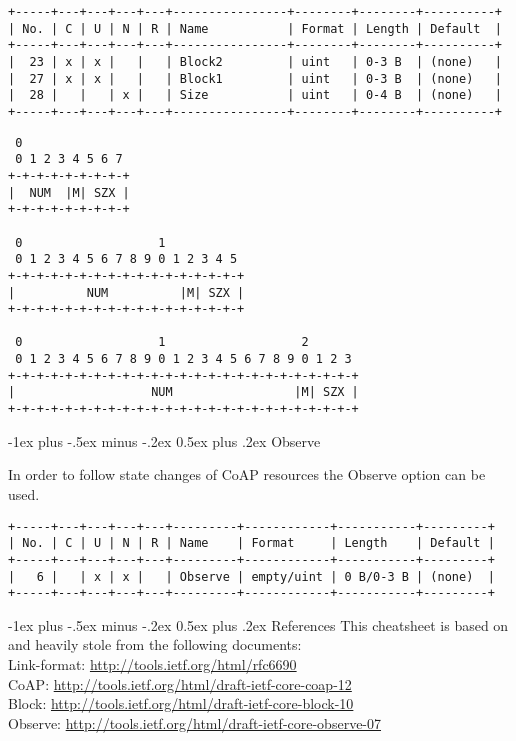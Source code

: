 \documentclass[10pt,landscape]{article}
\makeatletter
\renewcommand{\section}{\@startsection{section}{1}{0mm}%
                                {-1ex plus -.5ex minus -.2ex}%
                                {0.5ex plus .2ex}%
                                {\normalfont\large\bfseries}}
\makeatother
\begin{document}
\begin{multicols}{3}
{\tiny
\begin{verbatim}
+-----+---+---+---+---+----------------+--------+--------+----------+
| No. | C | U | N | R | Name           | Format | Length | Default  |
+-----+---+---+---+---+----------------+--------+--------+----------+
|  23 | x | x |   |   | Block2         | uint   | 0-3 B  | (none)   |
|  27 | x | x |   |   | Block1         | uint   | 0-3 B  | (none)   |
|  28 |   |   | x |   | Size           | uint   | 0-4 B  | (none)   |
+-----+---+---+---+---+----------------+--------+--------+----------+
\end{verbatim}
}
{\tiny
\begin{verbatim}
 0
 0 1 2 3 4 5 6 7
+-+-+-+-+-+-+-+-+
|  NUM  |M| SZX |
+-+-+-+-+-+-+-+-+

 0                   1
 0 1 2 3 4 5 6 7 8 9 0 1 2 3 4 5
+-+-+-+-+-+-+-+-+-+-+-+-+-+-+-+-+
|          NUM          |M| SZX |
+-+-+-+-+-+-+-+-+-+-+-+-+-+-+-+-+

 0                   1                   2
 0 1 2 3 4 5 6 7 8 9 0 1 2 3 4 5 6 7 8 9 0 1 2 3
+-+-+-+-+-+-+-+-+-+-+-+-+-+-+-+-+-+-+-+-+-+-+-+-+
|                   NUM                 |M| SZX |
+-+-+-+-+-+-+-+-+-+-+-+-+-+-+-+-+-+-+-+-+-+-+-+-+
\end{verbatim}
}

\section{Observe}

In order to follow state changes of CoAP resources the Observe option
can be used.

{\tiny
\begin{verbatim}
+-----+---+---+---+---+---------+------------+-----------+---------+
| No. | C | U | N | R | Name    | Format     | Length    | Default |
+-----+---+---+---+---+---------+------------+-----------+---------+
|   6 |   | x | x |   | Observe | empty/uint | 0 B/0-3 B | (none)  |
+-----+---+---+---+---+---------+------------+-----------+---------+
\end{verbatim}
}

\section{References}
This cheatsheet is based on and heavily stole from the following
documents:\\

{\tiny
Link-format: \url{http://tools.ietf.org/html/rfc6690}\\
CoAP: \url{http://tools.ietf.org/html/draft-ietf-core-coap-12}\\
Block: \url{http://tools.ietf.org/html/draft-ietf-core-block-10}\\
Observe: \url{http://tools.ietf.org/html/draft-ietf-core-observe-07}\\
}
%
%
\end{multicols}
\end{document}
